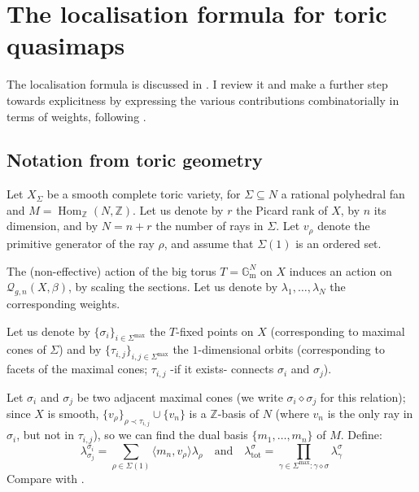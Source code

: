 \documentclass[11pt]{amsart}
\newcommand{\Q}[4]{\mathcal{Q}_{#1,#2}(#3,#4)}
\newcommand{\Hom}{\operatorname{Hom}}
\newcommand{\Gm}{\mathbb{G}_{\text{m}}}
\newcommand{\ZZ}{\mathbb{Z}}
\theoremstyle{definition}
\theoremstyle{definition}
\begin{document}
\section{The localisation formula for toric quasimaps}
The localisation formula is discussed in \cite[\S 5]{CF-K-higher-genus}. I review it and make a further step towards explicitness by expressing the various contributions combinatorially in terms of weights, following \cite{HolgerSpielberg}.
\subsection{Notation from toric geometry}
Let $X_\Sigma$ be a smooth complete toric variety, for $\Sigma\subseteq N$ a rational polyhedral fan and $M=\Hom_{\ZZ}(N,\ZZ)$. Let us denote by $r$ the Picard rank of $X$, by $n$ its dimension, and by $N=n+r$ the number of rays in $\Sigma$. Let $v_\rho$ denote the primitive generator of the ray $\rho$, and assume that $\Sigma(1)$ is an ordered set.

The (non-effective) action of the big torus $T=\Gm^N$ on $X$ induces an action on $\Q{g}{n}{X}{\beta}$, by scaling the sections. Let us denote by $\lambda_1,\ldots,\lambda_N$ the corresponding weights.

Let us denote by $\{\sigma_i\}_{i\in\Sigma^\text{max}}$ the $T$-fixed points on $X$ (corresponding to maximal cones of $\Sigma$) and by $\{\tau_{i,j}\}_{i,j\in\Sigma^\text{max}}$ the $1$-dimensional orbits (corresponding to facets of the maximal cones; $\tau_{i,j}$ -if it exists- connects $\sigma_i$ and $\sigma_j$).

Let $\sigma_i$ and $\sigma_j$ be two adjacent maximal cones (we write $\sigma_i\diamond\sigma_j$ for this relation); since $X$ is smooth, $\{v_\rho\}_{\rho\prec\tau_{i,j}}\cup\{v_n\}$ is a $\ZZ$-basis of $N$ (where $v_n$ is the only ray in $\sigma_i$, but not in $\tau_{i,j}$), so we can find the dual basis $\{m_1,\ldots,m_n\}$ of $M$. Define: \[\lambda^{\sigma_i}_{\sigma_j}=\sum_{\rho\in\Sigma(1)}\langle m_n,v_\rho\rangle\lambda_\rho \quad \text{and} \quad \lambda^{\sigma}_{\text{tot}}=\prod_{\gamma\in\Sigma^{\text{max}}\colon\gamma\diamond\sigma}\lambda^\sigma_\gamma\] Compare with \cite[\S\S 6.4 and 7.3]{HolgerSpielberg}.
\end{document}

